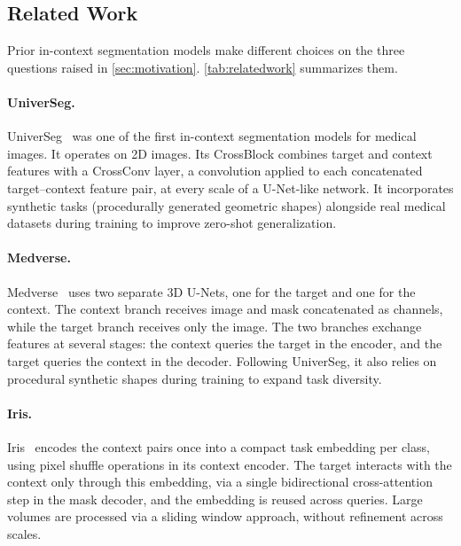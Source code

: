 \subsection{Related Work}\label{sec:fundamentals-relatedwork}

Prior in-context segmentation models make different choices on the three
questions raised in \autoref{sec:motivation}. \autoref{tab:relatedwork}
summarizes them.

\paragraph{UniverSeg.}
UniverSeg~\cite{butoiUniverSegUniversalMedical2023} was one of the first
in-context segmentation models for medical images. It operates on 2D images.
Its CrossBlock combines target and context features with a CrossConv layer, a
convolution applied to each concatenated target--context feature pair, at every
scale of a U-Net-like network. It incorporates 
synthetic tasks (procedurally generated geometric shapes) alongside real 
medical datasets during training to improve zero-shot generalization.



\paragraph{Medverse.}
Medverse~\cite{huMedverseUniversalModel2025a} uses two separate 3D U-Nets, one
for the target and one for the context. The context branch receives image and
mask concatenated as channels, while the target branch receives only the image.
The two branches exchange features at several stages: the context queries the
target in the encoder, and the target queries the context in the decoder.  Following UniverSeg, it also relies on procedural synthetic shapes 
during training to expand task diversity.

\paragraph{Iris.}
Iris~\cite{gaoShowSegmentUniversal2025} encodes the context pairs once into a
compact task embedding per class, using pixel shuffle operations in its context
encoder. The target interacts with the context only through this embedding, via
a single bidirectional cross-attention step in the mask decoder, and the
embedding is reused across queries. Large volumes are processed via a sliding window approach, without
refinement across scales.

